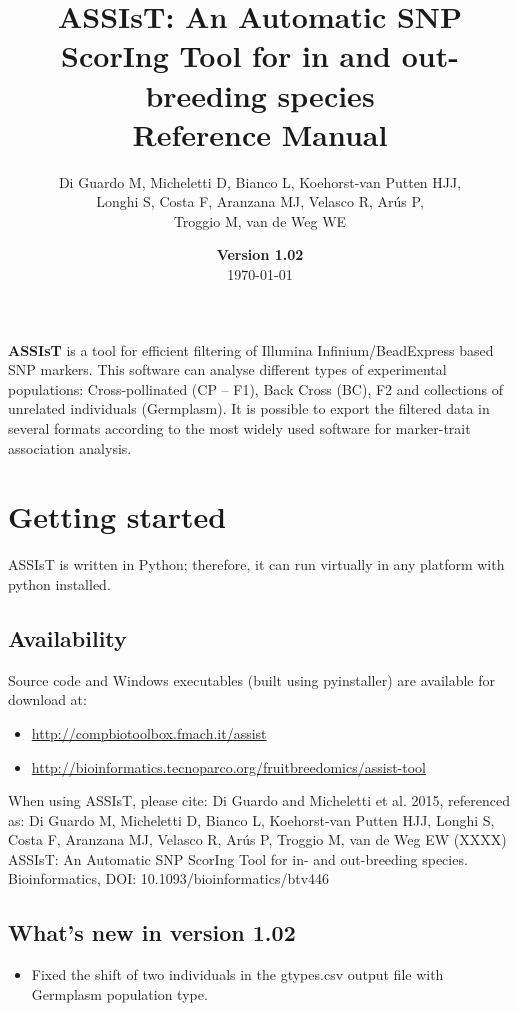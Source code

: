 \documentclass[a4paper,11pt,english]{article}
\title{ASSIsT: An Automatic SNP ScorIng Tool for in and out-breeding species\\
Reference Manual}
\date{\textbf{Version 1.02}\\ \today}
\author{Di Guardo M,
Micheletti D,
Bianco L,
Koehorst-van Putten HJJ,\\
Longhi S,
Costa F,
Aranzana MJ,
Velasco R,
Arús P,\\
Troggio M,
van de Weg WE
}
\begin{document}
\maketitle
\tableofcontents

\newpage
\textbf{ASSIsT} is a tool for efficient filtering of Illumina Infinium/BeadExpress based SNP
markers. This software can analyse different types of experimental populations: Cross-pollinated
(CP – F1), Back Cross (BC), F2 and collections of unrelated individuals (Germplasm). It is possible
to export the filtered data in several formats according to the most widely used software for
marker-trait association analysis.



\section{Getting started}
\label{index:getting-started}\label{
index:assist-an-automatic-snp-scoring-tool-for-in-and-out-breeding-species}
ASSIsT is written in Python; therefore, it can run virtually in any platform with python installed.


\subsection{Availability}
\label{index:availability}
Source code and  Windows executables (built using pyinstaller) are available for download at:
\begin{itemize}
 \item \href{http://compbiotoolbox.fmach.it/assist}{http://compbiotoolbox.fmach.it/assist} 
 \item \href{http://bioinformatics.tecnoparco.org/fruitbreedomics/assist-tool}{
http://bioinformatics.tecnoparco.org/fruitbreedomics/assist-tool}
\end{itemize}



When using ASSIsT, please cite:
Di Guardo and Micheletti et al. 2015, 
referenced as:
Di Guardo M, Micheletti D, Bianco L, Koehorst-van Putten HJJ, Longhi S, Costa F, Aranzana MJ,
Velasco R, Arús P, Troggio M, van de Weg EW (XXXX) ASSIsT: An Automatic SNP ScorIng Tool for in- and
out-breeding species. Bioinformatics, DOI: 10.1093/bioinformatics/btv446

\subsection{What's new in version 1.02}
\label{index:{What's new in version 1.02}}
\begin{itemize}
\item Fixed the shift of two individuals in the gtypes.csv output file with Germplasm population type.
\end{itemize}
\end{document}
